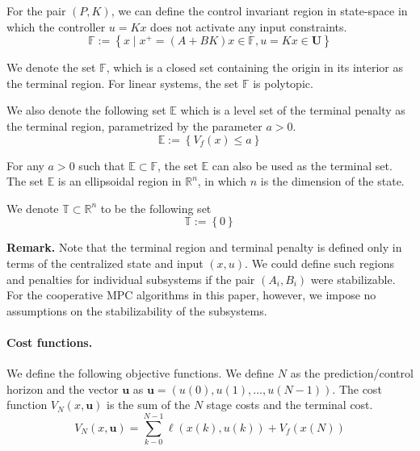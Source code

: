\documentclass[10pt, twocolumn]{article}
\newcommand{\bu}{\mathbf{u}}
\newcommand{\set}[1]{\left\lbrace #1 \right\rbrace}
\theoremstyle{definition}
\begin{document}
For the pair $(P,K)$, we can define the control invariant  region in state-space in which the controller $u=Kx$ does not activate any input constraints. 
\[ \mathbb{F}:= \set{x \mid x^+ = (A+BK)x \in \mathbb{F}, u = Kx \in \mathbf{U}} \]

We denote the set $\mathbb{F}$, which is a closed set containing the origin in its interior  as the terminal region. For linear systems, the set $\mathbb{F}$ is polytopic.

We also denote the following set $\mathbb{E}$ which is a level set of the terminal penalty as the terminal region, parametrized by the parameter $a>0$.
\[ \mathbb{E}:= \set{V_f(x) \leq a}
\]

For any $a>0$ such that $\mathbb{E} \subset \mathbb{F}$, the set
$\mathbb{E}$ can also be used as the terminal set. The set
$\mathbb{E}$ is an ellipsoidal region in $\mathbb{R}^{n}$, in which
$n$ is the dimension of the state.

We denote $\mathbb{T} \subset \mathbb{R}^n$ to be the following set
\[ \mathbb{T} := \set{0} \]

\textbf{Remark.} Note that the terminal region and terminal penalty is defined only in terms of the centralized state and input $(x,u)$. We could define such regions and penalties for individual subsystems if the pair $(A_i,B_i)$ were stabilizable. For the cooperative MPC algorithms in this paper, however, we impose no assumptions on the stabilizability of the subsystems.

\paragraph{\textbf{Cost functions.}} We define the following objective functions. We define $N$ as the prediction/control horizon and the vector $\bu$ as $\bu = (u(0),u(1),\ldots,u(N-1))$. 
The cost function $V_N(x,\bu)$ is the sum of the $N$ stage costs and the terminal cost.
\[V_N(x,\bu) = \sum_{k-0}^{N-1} \ell(x(k),u(k)) + V_f(x(N)) \]
\end{document}
